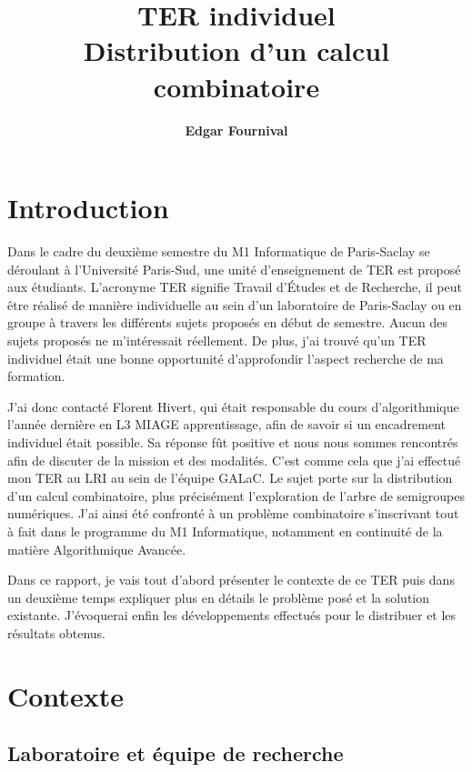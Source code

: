 \documentclass[12pt,a4paper]{report}
\title{\bfseries\LARGE TER individuel\\[0.5em]\Huge Distribution d'un calcul combinatoire}
\author{\bfseries\Large Edgar Fournival}
\date{}
\begin{document}
\maketitle

\tableofcontents

\chapter*{Introduction}

Dans le cadre du deuxième semestre du M1 Informatique de Paris-Saclay se déroulant à l'Université Paris-Sud, une unité d'enseignement de TER est proposé aux étudiants. L'acronyme TER signifie Travail d'Études et de Recherche, il peut être réalisé de manière individuelle au sein d'un laboratoire de Paris-Saclay ou en groupe à travers les différents sujets proposés en début de semestre. Aucun des sujets proposés ne m'intéressait réellement. De plus, j'ai trouvé qu'un TER individuel était une bonne opportunité d'approfondir l'aspect recherche de ma formation.

J'ai donc contacté Florent Hivert, qui était responsable du cours d'algorithmique l'année dernière en L3 MIAGE apprentissage, afin de savoir si un encadrement individuel était possible. Sa réponse fût positive et nous nous sommes rencontrés afin de discuter de la mission et des modalités. C'est comme cela que j'ai effectué mon TER au LRI au sein de l'équipe GALaC. Le sujet porte sur la distribution d'un calcul combinatoire, plus précisément l'exploration de l'arbre de semigroupes numériques. J'ai ainsi été confronté à un problème combinatoire s'inscrivant tout à fait dans le programme du M1 Informatique, notamment en continuité de la matière Algorithmique Avancée.

Dans ce rapport, je vais tout d'abord présenter le contexte de ce TER puis dans un deuxième temps expliquer plus en détails le problème posé et la solution existante. J'évoquerai enfin les développements effectués pour le distribuer et les résultats obtenus.

\chapter{Contexte}

\section{Laboratoire et équipe de recherche}
\end{document}
